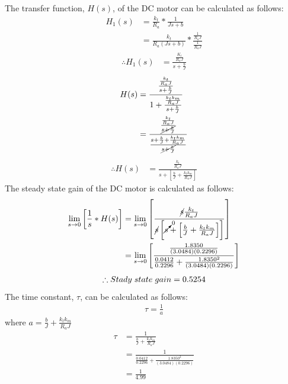 \documentclass[hidelinks]{article}
\begin{document}
	\noindent The transfer function, $H(s)$, of the DC motor can be calculated as follows:
	\begin{align}
		\label{eq1}
		H_1(s) &= \frac{k_t}{R_a} * \frac{1}{Js + b}\nonumber\\
		&= \frac{k_t}{R_a(Js + b)} * \frac{\frac{1}{R_a J}}{\frac{1}{R_a J}}\nonumber
	\end{align}
	\begin{align}
		\therefore H_1(s) &= \frac{\frac{K_t}{R_a J}}{s + \frac{b}{J}}
	\end{align}
	\begin{align}
		H(s) &= \frac{\frac{\frac{k_t}{R_a J}}{s + \frac{b}{J}}}{1 + \frac{\frac{k_t k_m}{R_a J}}{s + \frac{b}{J}}}\nonumber\\
		&= \frac{\frac{\frac{k_t}{R_a J}}{\cancel{s + \frac{b}{J}}}}{\frac{s + \frac{b}{J} + \frac{k_t k_m}{R_a J}}{\cancel{s + \frac{b}{J}}}}\nonumber
	\end{align}
	\begin{align}
		\therefore H(s) &= \frac{\frac{k_t}{R_a J}}{s + [\frac{b}{J} + \frac{k_t k_m}{R_a J}]}
	\end{align}
	The steady state gain of the DC motor is calculated as follows:
	\begin{align}
		\lim_{s \to 0} \left[\frac{1}{s} * H(s)\right] &= \lim_{s \to 0} \left[\frac{\cancel{s} \frac{k_t}{R_a J}}{\cancel{s} \left[\cancelto{0}{s} + \left[\frac{b}{J} + \frac{k_t k_m}{R_a J}\right]\right]}\right]\nonumber\\	
		&= \lim_{s \to 0} \left[\frac{\frac{1.8350}{(3.0484)(0.2296)}}{\frac{0.0412}{0.2296} + \frac{1.8350^2}{(3.0484)(0.2296)}}\right]\nonumber
	\end{align}
	\begin{align}
		\therefore Stady\hspace{1mm} state\hspace{1mm} gain = 0.5254 \nonumber
	\end{align}
	The time constant, $\tau$, can be calculated as follows:
	\begin{align}
		\tau = \frac{1}{a}
	\end{align}
	where $a = \frac{b}{J} + \frac{k_t k_m}{R_a J}$
	\begin{align}
		\tau &= \frac{1}{\frac{b}{J} + \frac{k_t k_m}{R_a J}}\nonumber\\
		&= \frac{1}{\frac{0.0412}{0.2296} + \frac{1.8350^2}{(3.0484)(0.2296)}}\nonumber\\
		&= \frac{1}{4.99}\nonumber
	\end{align}
\end{document}
